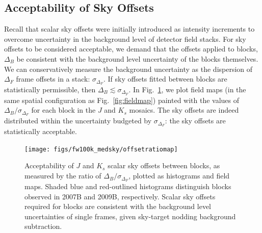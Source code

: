 \documentclass[iop]{emulateapj}
\newcommand{\Fig}[1]{Fig.~\ref{fig:#1}}  %
\begin{document}
\begin{table}[t]
\centering
\caption[Hierarchy of scalar sky offsets]{Hierarchy of scalar sky offsets (using \texttt{FW100K} RT flat fielding, and median background subtraction).
The `Total' sky offsets track the net offset of individual WIRCam image frames into the fitted mosaic.
$\langle I_\mathrm{sky}\rangle$ is taken as the instantaneous background level for the images being sampled (see \Fig{net_sky_level} for the distribution of levels).
Offset distributions are also presented in units of the WIRCam mosaics, DN, corresponding to a zero-point of 25 mag.}
\label{tab:offset_hierarchy}

\end{table}

\subsection{Acceptability of Sky Offsets}
\label{sec:offset_acceptability}

Recall that scalar sky offsets were initially introduced as intensity increments to overcome uncertainty in the background level of detector field stacks.
For sky offsets to be considered acceptable, we demand that the offsets applied to blocks, $\Delta_B$ be consistent with the background level uncertainty of the blocks themselves.
We can conservatively measure the background uncertainty as the dispersion of $\Delta_F$ frame offsets in a stack: $\sigma_{\Delta_F}$.
If sky offsets fitted between blocks are statistically permissible, then $\Delta_B \lesssim \sigma_{\Delta_F}$.
In \Fig{offset_ratio_map}, we plot field maps (in the same spatial configuration as \Fig{fieldmap}) painted with the values of $\Delta_B / \sigma_{\Delta_F}$ for each block in the $J$ and $K_s$ mosaics.
The sky offsets are indeed distributed within the uncertainty budgeted by $\sigma_{\Delta_F}$: the sky offsets are statistically acceptable.

\begin{figure}[t]
\centering
\texttt{[image: figs/fw100k\_medsky/offsetratiomap]}
\caption{Acceptability of $J$ and $K_s$ scalar sky offsets between blocks, as measured by the ratio of $\Delta_B/\sigma_{\Delta_F}$, plotted as histograms and field maps. Shaded blue and red-outlined histograms distinguish blocks observed in 2007B and 2009B, respectively. Scalar sky offsets required for blocks are consistent with the background level uncertainties of single frames, given sky-target nodding background subtraction.}
\label{fig:offset_ratio_map}
\end{figure}
\end{document}
